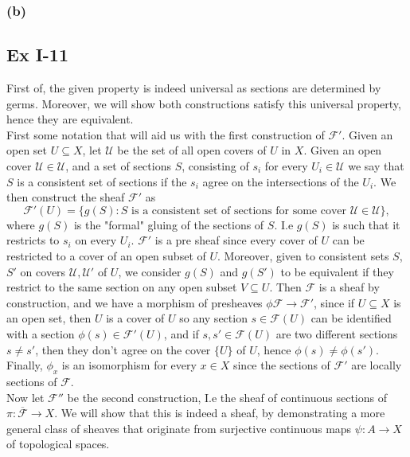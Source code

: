 \documentclass{article}
\theoremstyle{definition}
\begin{document}
\subsubsection*{(b)}

\subsection*{Ex I-11}

First of, the given property is indeed universal as sections are determined by
germs. Moreover, we will show both constructions satisfy this universal
property, hence they are equivalent. \\

First some notation that will aid us with the first construction of
$\mathscr{F}'$. Given an open set $U \subseteq X$, let $\mathscr{U}$ be the set
of all open covers of $U$ in $X$. Given an open cover $\mathcal{U} \in
\mathscr{U}$, and a set of sections $S$, consisting of $s_i$ for every $U_i \in
\mathcal{U}$ we say that $S$ is a consistent set of sections if the $s_i$ agree
on the intersections of the $U_i$. We then construct the sheaf $\mathscr{F}'$
as
\[
	\mathscr{F}'(U) 
	= 
	\{
		g(S) 
		: 
		S \text{ is a consistent set of sections for some cover } \mathcal{U} \in \mathscr{U} 
	\},
\]
where $g(S)$ is the "formal" gluing of the sections of $S$. I.e $g(S)$ is such
that it restricts to $s_i$ on every $U_i$. $\mathscr{F}'$ is a pre sheaf since
every cover of $U$ can be restricted to a cover of an open subset of $U$.
Moreover, given to consistent sets $S$, $S'$ on covers $\mathcal{U},
\mathcal{U}'$ of $U$, we consider $g(S)$ and $g(S')$ to be equivalent if they
restrict to the same section on any open subset $V \subseteq U$. Then
$\mathscr{F}$ is a sheaf by construction, and we have a morphism of presheaves
$\phi \mathscr{F} \to \mathscr{F}'$, since if $U \subseteq X$ is an open set,
then $U$ is a cover of $U$ so any section $s \in \mathscr{F}(U)$ can be
identified with a section $\phi(s) \in \mathscr{F}'(U)$, and if $s, s' \in
\mathscr{F}(U)$ are two different sections $s \not = s'$, then they don't agree
on the cover $\{U\}$ of $U$, hence $\phi(s) \not = \phi(s')$. Finally, $\phi_x$
is an isomorphism for every $x \in X$ since the sections of $\mathscr{F}'$ are
locally sections of $\mathscr{F}$. \\

Now let $\mathscr{F}''$ be the second construction, I.e the sheaf of continuous
sections of $\pi : \overline{\mathscr{F}} \to X$. We will show that this is
indeed a sheaf, by demonstrating a more general class of sheaves that originate
from surjective continuous maps $\psi : A \to X$ of topological spaces. \\
\end{document}

